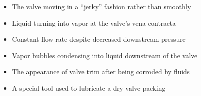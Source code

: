 \begin{itemize}
\item{} The valve moving in a ``jerky'' fashion rather than smoothly
\vskip 5pt 
\item{} Liquid turning into vapor at the valve's vena contracta
\vskip 5pt 
\item{} Constant flow rate despite decreased downstream pressure 
\vskip 5pt 
\item{} Vapor bubbles condensing into liquid downstream of the valve
\vskip 5pt 
\item{} The appearance of valve trim after being corroded by fluids
\vskip 5pt 
\item{} A special tool used to lubricate a dry valve packing
\end{itemize}




